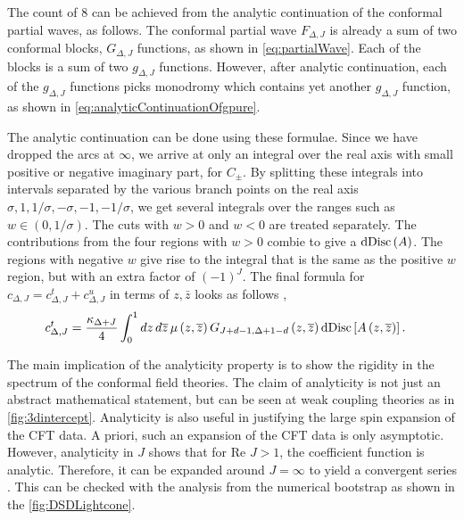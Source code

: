 The count of $ 8 $ can be achieved from the analytic continuation of the conformal partial waves, as follows.
The conformal partial wave $ F_{ \Delta, J } $ is already a sum of two conformal blocks, $ G_{\Delta,J} $ functions, as shown in \cref{eq:partialWave}.
Each of the blocks is a sum of two $ g_{\Delta,J} $ functions.
However, after analytic continuation, each of the $ g_{\Delta,J} $ functions picks monodromy which contains yet another $ g_{\Delta,J} $ function, as shown in \cref{eq:analyticContinuationOfgpure}.

The analytic continuation can be done using these formulae.
Since we have dropped the arcs at $ \infty $, we arrive at only an integral over the real axis with small positive or negative imaginary part, for $ C_{\pm} $.
By splitting these integrals into intervals separated by the various branch points on the real axis $ \sigma, 1 , 1/\sigma,-\sigma, -1 , -1/\sigma $, we get several integrals over the ranges such as $ w \in \left( 0,1/\sigma \right) $.
The cuts with $ w>0 $ and $ w < 0 $ are treated separately.
The contributions from the four regions with $ w>0 $ combie to give a $ \text{dDisc} \left( A \right) $.
The regions with negative $ w $ give rise to the integral that is the same as the positive $ w $ region, but with an extra factor of $ \left( -1 \right)^J $.
The final formula for $ c_{\Delta,J} = c^{t}_{\Delta,J} + c^{u}_{\Delta,J} $ in terms of $ z,\bar{z} $ looks as follows \cite{Caron-Huot:2017vep},
\begin{align}
  c^{t}_{\Delta,J} & = \frac{\kappa_{\Delta+J}}{4} \int_{0}^{1} dz \, d\overline{z} \, \mu\left( z, \overline{z} \right) G_{J+d-1,\Delta+1-d}\left( z,\overline{z} \right) \text{dDisc}\left[ A \left( z, \overline{z} \right) \right]
  .
\end{align}





The main implication of the analyticity property is to show the rigidity in the spectrum of the conformal field theories.
The claim of analyticity is not just an abstract mathematical statement, but can be seen at weak coupling theories as in \cref{fig:3dintercept}.
Analyticity is also useful in justifying the large spin expansion of the CFT data.
A priori, such an expansion of the CFT data is only asymptotic.
However, analyticity in $ J $ shows that for $ \text{Re } J >1$, the coefficient function is analytic.
Therefore, it can be expanded around $ J = \infty $ to yield a convergent series \cite{Simmons-Duffin:2016wlq}.
This can be checked with the analysis from the numerical bootstrap as shown in the \cref{fig:DSDLightcone}.



